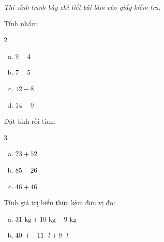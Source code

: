 {\itshape Thí sinh trình bày chi tiết bài làm vào giấy kiểm tra.}

\begin{bt}[1,0 điểm]
Tính nhẩm:
\begin{multicols}{2}
\begin{enumerate}[a)]
  \item $9 + 4$
  \item $7 + 5$
  \item $12 - 8$
  \item $14 - 9$
\end{enumerate}
\end{multicols}
\end{bt}

\begin{bt}[1,5 điểm]
Đặt tính rồi tính:
\begin{multicols}{3}
\begin{enumerate}[a)]
  \item $23 + 52$
  \item $85 - 26$
  \item $46 + 46$
\end{enumerate}
\end{multicols}
\end{bt}

\begin{bt}[1,0 điểm]
Tính giá trị biểu thức kèm đơn vị đo:
\begin{enumerate}[a)]
  \item $31\text{ kg} + 10\text{ kg} - 9\text{ kg}$
  \item $40\text{ }l - 11\text{ }l + 9\text{ }l$
\end{enumerate}
\end{bt}

